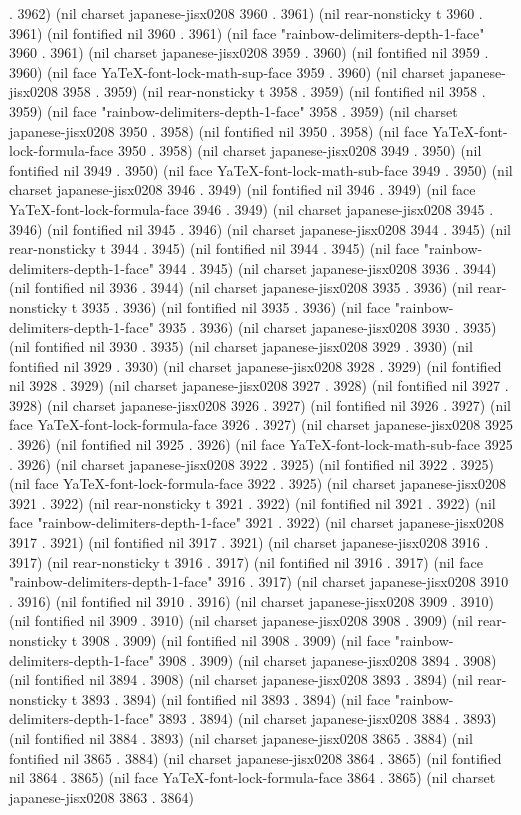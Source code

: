 . 3962) (nil charset japanese-jisx0208 3960 . 3961) (nil rear-nonsticky t 3960 . 3961) (nil fontified nil 3960 . 3961) (nil face "rainbow-delimiters-depth-1-face" 3960 . 3961) (nil charset japanese-jisx0208 3959 . 3960) (nil fontified nil 3959 . 3960) (nil face YaTeX-font-lock-math-sup-face 3959 . 3960) (nil charset japanese-jisx0208 3958 . 3959) (nil rear-nonsticky t 3958 . 3959) (nil fontified nil 3958 . 3959) (nil face "rainbow-delimiters-depth-1-face" 3958 . 3959) (nil charset japanese-jisx0208 3950 . 3958) (nil fontified nil 3950 . 3958) (nil face YaTeX-font-lock-formula-face 3950 . 3958) (nil charset japanese-jisx0208 3949 . 3950) (nil fontified nil 3949 . 3950) (nil face YaTeX-font-lock-math-sub-face 3949 . 3950) (nil charset japanese-jisx0208 3946 . 3949) (nil fontified nil 3946 . 3949) (nil face YaTeX-font-lock-formula-face 3946 . 3949) (nil charset japanese-jisx0208 3945 . 3946) (nil fontified nil 3945 . 3946) (nil charset japanese-jisx0208 3944 . 3945) (nil rear-nonsticky t 3944 . 3945) (nil fontified nil 3944 . 3945) (nil face "rainbow-delimiters-depth-1-face" 3944 . 3945) (nil charset japanese-jisx0208 3936 . 3944) (nil fontified nil 3936 . 3944) (nil charset japanese-jisx0208 3935 . 3936) (nil rear-nonsticky t 3935 . 3936) (nil fontified nil 3935 . 3936) (nil face "rainbow-delimiters-depth-1-face" 3935 . 3936) (nil charset japanese-jisx0208 3930 . 3935) (nil fontified nil 3930 . 3935) (nil charset japanese-jisx0208 3929 . 3930) (nil fontified nil 3929 . 3930) (nil charset japanese-jisx0208 3928 . 3929) (nil fontified nil 3928 . 3929) (nil charset japanese-jisx0208 3927 . 3928) (nil fontified nil 3927 . 3928) (nil charset japanese-jisx0208 3926 . 3927) (nil fontified nil 3926 . 3927) (nil face YaTeX-font-lock-formula-face 3926 . 3927) (nil charset japanese-jisx0208 3925 . 3926) (nil fontified nil 3925 . 3926) (nil face YaTeX-font-lock-math-sub-face 3925 . 3926) (nil charset japanese-jisx0208 3922 . 3925) (nil fontified nil 3922 . 3925) (nil face YaTeX-font-lock-formula-face 3922 . 3925) (nil charset japanese-jisx0208 3921 . 3922) (nil rear-nonsticky t 3921 . 3922) (nil fontified nil 3921 . 3922) (nil face "rainbow-delimiters-depth-1-face" 3921 . 3922) (nil charset japanese-jisx0208 3917 . 3921) (nil fontified nil 3917 . 3921) (nil charset japanese-jisx0208 3916 . 3917) (nil rear-nonsticky t 3916 . 3917) (nil fontified nil 3916 . 3917) (nil face "rainbow-delimiters-depth-1-face" 3916 . 3917) (nil charset japanese-jisx0208 3910 . 3916) (nil fontified nil 3910 . 3916) (nil charset japanese-jisx0208 3909 . 3910) (nil fontified nil 3909 . 3910) (nil charset japanese-jisx0208 3908 . 3909) (nil rear-nonsticky t 3908 . 3909) (nil fontified nil 3908 . 3909) (nil face "rainbow-delimiters-depth-1-face" 3908 . 3909) (nil charset japanese-jisx0208 3894 . 3908) (nil fontified nil 3894 . 3908) (nil charset japanese-jisx0208 3893 . 3894) (nil rear-nonsticky t 3893 . 3894) (nil fontified nil 3893 . 3894) (nil face "rainbow-delimiters-depth-1-face" 3893 . 3894) (nil charset japanese-jisx0208 3884 . 3893) (nil fontified nil 3884 . 3893) (nil charset japanese-jisx0208 3865 . 3884) (nil fontified nil 3865 . 3884) (nil charset japanese-jisx0208 3864 . 3865) (nil fontified nil 3864 . 3865) (nil face YaTeX-font-lock-formula-face 3864 . 3865) (nil charset japanese-jisx0208 3863 . 3864) 